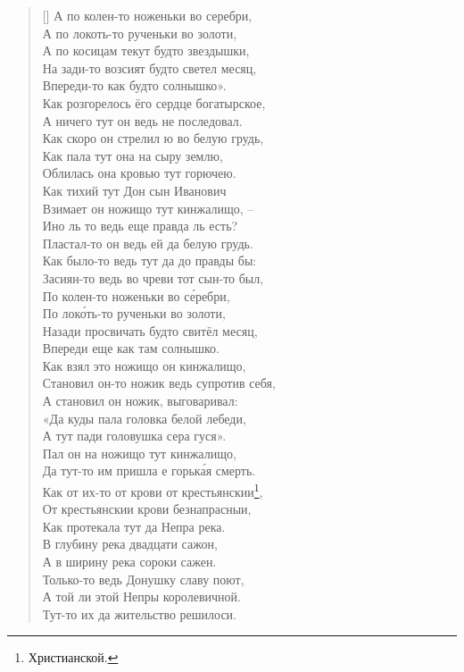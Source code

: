 \begin{verse}[\versewidth]
А по колен-то ноженьки во серебри,\\
А по локоть-то рученьки во золоти,\\
А по косицам текут будто звездышки,\\
На зади-то возсият будто светел месяц,\\
Впереди-то как будто солнышко».\\
Как розгорелось ёго сердце богатырское,\\
А ничего тут он ведь не последовал.\\
Как скоро он стрелил ю во белую грудь,\\
Как пала тут она на сыру землю,\\
Облилась она кровью тут горючею.\\
Как тихий тут Дон сын Иванович\\
Взимает он ножищо тут кинжалищо, – \\
Ино ль то ведь еще правда ль есть?\\
Пластал-то он ведь ей да белую грудь.\\
Как было-то ведь тут да до правды бы:\\
Засиян-то ведь во чреви тот сын-то был,\\
По колен-то ноженьки во с\'еребри,\\
По лок\'оть-то рученьки во золоти,\\
Назади просвичать будто свитёл месяц,\\
Впереди еще как там солнышко.\\
Как взял это ножищо он кинжалищо,\\
Становил он-то ножик ведь супротив себя,\\
А становил он ножик, выговаривал:\\
«Да куды пала головка белой лебеди,\\
А тут пади головушка сера гуся».\\
Пал он на ножищо тут кинжалищо,\\
Да тут-то им пришла е горьк\'ая смерть.\\
Как от их-то от крови от крестьянскии\footnote{Христианской.},\\
От крестьянскии крови безнапрасныи,\\
Как протекала тут да Непра река.\\
В глубину река двадцати сажон,\\
А в ширину река сороки сажен.\\
Только-то ведь Донушку славу поют,\\
А той ли этой Непры королевичной.\\
Тут-то их да жительство решилоси.\\
\end{verse}

